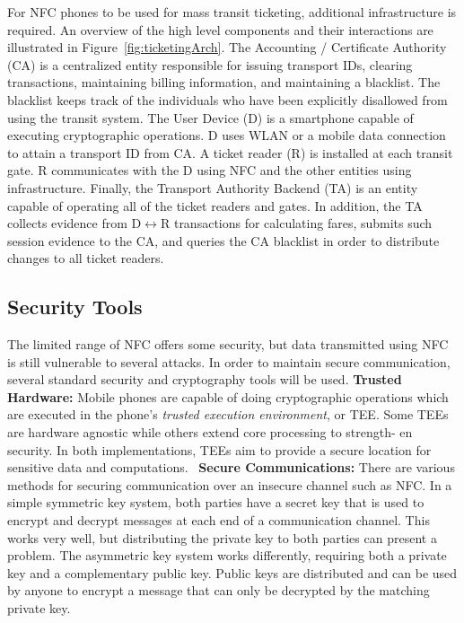 \documentclass{sig-alternate}
\begin{document}
For NFC phones to be used for mass transit ticketing, additional infrastructure is required. An overview of the high level components and their interactions are illustrated in Figure~\ref{fig:ticketingArch}. The Accounting / Certificate Authority (CA) is a centralized entity responsible for issuing transport IDs, clearing transactions, maintaining billing information, and maintaining a blacklist. The blacklist keeps track of the individuals who have been explicitly disallowed from using the transit system. The User Device (D) is a smartphone capable of executing cryptographic operations. D uses WLAN or a mobile data connection to attain a transport ID from CA. A ticket reader (R) is installed at each transit gate. R communicates with the D using NFC and the other entities using infrastructure. Finally, the Transport Authority Backend (TA) is an entity capable of operating all of the ticket readers and gates. In addition, the TA collects evidence from D$\leftrightarrow$R transactions for calculating fares, submits such session evidence to the CA, and queries the CA blacklist in order to distribute changes to all ticket readers.

\subsection{Security Tools}
The limited range of NFC offers some security, but data transmitted using NFC is still vulnerable to several attacks. In order to maintain secure communication, several standard security and cryptography tools will be used.
\vspace{2mm}\newline
\noindent\textbf{Trusted Hardware:}
Mobile phones are capable of doing cryptographic operations which are executed in the phone's \textit{trusted execution environment}, or TEE. Some TEEs are hardware agnostic while others extend core processing to strength- en security. In both implementations, TEEs aim to provide a secure location for sensitive data and computations.~\cite{Ticket2011}
\vspace{2mm}\newline
\textbf{Secure Communications:}
There are various methods for securing communication over an insecure channel such as NFC. In a simple symmetric key system, both parties have a secret key that is used to encrypt and decrypt messages at each end of a communication channel. This works very well, but distributing the private key to both parties can present a problem. The asymmetric key system works differently, requiring both a private key and a complementary public key. Public keys are distributed and can be used by anyone to encrypt a message that can only be decrypted by the matching private key.
\end{document}
